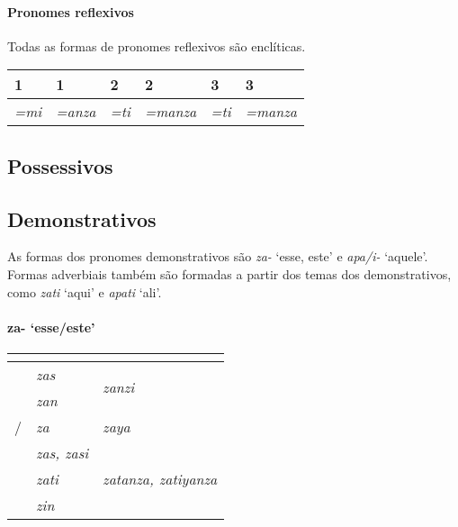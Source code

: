 \paragraph{Pronomes reflexivos}
Todas as formas de pronomes reflexivos são enclíticas.

\begin{center}
	\begin{tabular}[c]{llllll}
		\toprule
		1\Sg{}\emph{} & 1\Pl{}\emph{} & 2\Sg{}\emph{} & 2\Pl{}\emph{} & 3\Sg{}\emph{} & 3\Pl{}\emph{} \\
		\midrule
		\emph{=mi}    & \emph{=anza}  & \emph{=ti}    & \emph{=manza} & \emph{=ti}    & \emph{=manza} \\
		\bottomrule
	\end{tabular}
\end{center}

\subsection{Possessivos}

\subsection{Demonstrativos}
As formas dos pronomes demonstrativos são \emph{za-} `esse, este' e
\emph{apa\slash{}i-} `aquele'.
Formas adverbiais também são formadas a partir dos temas dos demonstrativos,
como \emph{zati} `aqui' e \emph{apati} `ali'.
\vfill
\clearpage

\paragraph{za- `esse/este'}

\begin{center}
	\begin{tabular}[c]{lll}
		\toprule
		                 & \Sg{}\emph{}     & \Pl{}\emph{}                    \\
		\midrule
		\Nom{} \Com{}    & \emph{zas}       & \multirow{2}{4em}{\emph{zanzi}} \\
		\Acu{} \Com{}    & \emph{zan}       &                                 \\
		\Nom/\Acu\Neut{} & \emph{za}        & \emph{zaya}                     \\
		\Gen{}           & \emph{zas, zasi} &                                 \\
		\Dat{}           & \emph{zati}      & \emph{zatanza, zatiyanza}       \\
		\Abl{}           & \emph{zin}       & \emph{}                         \\
		\bottomrule
	\end{tabular}
\end{center}

